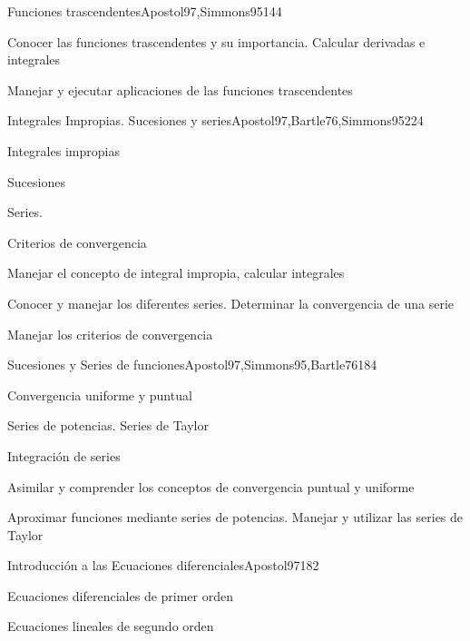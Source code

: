 \begin{syllabus}
\begin{unit}{Funciones trascendentes}{Apostol97,Simmons95}{14}{4}
   \begin{unitgoals}
      \item Conocer las funciones trascendentes y su importancia. Calcular derivadas e integrales
      \item Manejar y ejecutar aplicaciones de las funciones trascendentes
      \end{unitgoals}
\end{unit}

\begin{unit}{Integrales Impropias. Sucesiones y series}{Apostol97,Bartle76,Simmons95}{22}{4}
   \begin{topics}
      \item Integrales impropias
      \item Sucesiones
      \item Series.
      \item Criterios de convergencia
   \end{topics}

   \begin{unitgoals}
      \item Manejar el concepto de integral impropia, calcular integrales
      \item Conocer y manejar los diferentes series. Determinar la convergencia de una serie
      \item Manejar los criterios de convergencia
      \end{unitgoals}
\end{unit}

\begin{unit}{Sucesiones y Series de funciones}{Apostol97,Simmons95,Bartle76}{18}{4}
   \begin{topics}
      \item Convergencia uniforme y puntual
      \item Series de potencias. Series de Taylor
      \item Integración de series
   \end{topics}

   \begin{unitgoals}
      \item Asimilar y comprender los conceptos de convergencia puntual y uniforme
      \item Aproximar funciones mediante series de potencias. Manejar y utilizar las series de Taylor
      \end{unitgoals}
\end{unit}

\begin{unit}{Introducción a las Ecuaciones diferenciales}{Apostol97}{18}{2}
   \begin{topics}
      \item Ecuaciones diferenciales de primer orden
      \item Ecuaciones lineales de segundo orden
   \end{topics}


\end{unit}
\end{syllabus}
